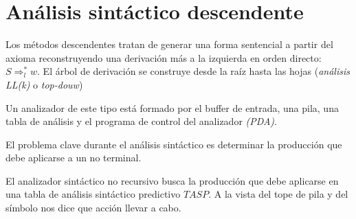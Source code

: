 %
%
%
%

\section{Análisis sintáctico descendente}

Los métodos descendentes tratan de generar una forma sentencial  a partir del axioma reconstruyendo una  derivación más a la izquierda en orden directo: $S\Rightarrow_{l}^{*}w$. El árbol de derivación se construye desde la raíz hasta las hojas (\textit{análisis LL(k)} o \textit{top-douw})

Un analizador de este tipo está formado por el buffer de entrada, una pila, una tabla de análisis y el programa de control del analizador \textit{(PDA)}.



El problema clave durante el análisis sintáctico es determinar la producción que debe aplicarse a un no terminal. 

El analizador sintáctico no recursivo  busca la producción que debe aplicarse en una tabla de análisis sintáctico predictivo $TASP$. A la vista del tope de pila y del símbolo nos dice que acción llevar a cabo.
              
